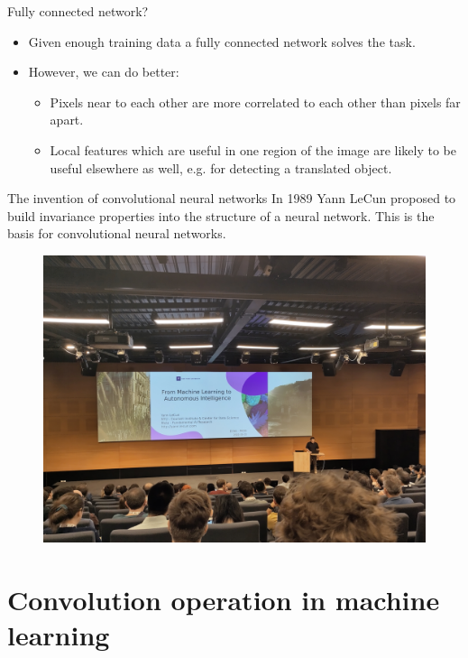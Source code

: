 \documentclass{beamer}
\begin{document}
	\begin{frame}{Fully connected network?}
	\begin{itemize}
		\item Given enough training data a fully connected network solves the task. %
		\item However, we can do better: %
		\begin{itemize}
			\item Pixels near to each other are more correlated to each other than pixels far apart. %
			\item Local features which are useful in one region of the image are likely to be useful elsewhere as well, e.g. for detecting a translated object.
		\end{itemize} %
	\end{itemize} 
	\end{frame}

    \begin{frame}{The invention of convolutional neural networks}
        In 1989 Yann LeCun proposed to build invariance properties into the structure of a neural network. This is the basis for convolutional neural networks.
				\begin{figure}%
				\centering
				\includegraphics[width=.6\linewidth]{figures/IMG_20220923_090433.jpg}
				\end{figure}   
    \end{frame}
		
    \section{Convolution operation in machine learning}
\end{document}

